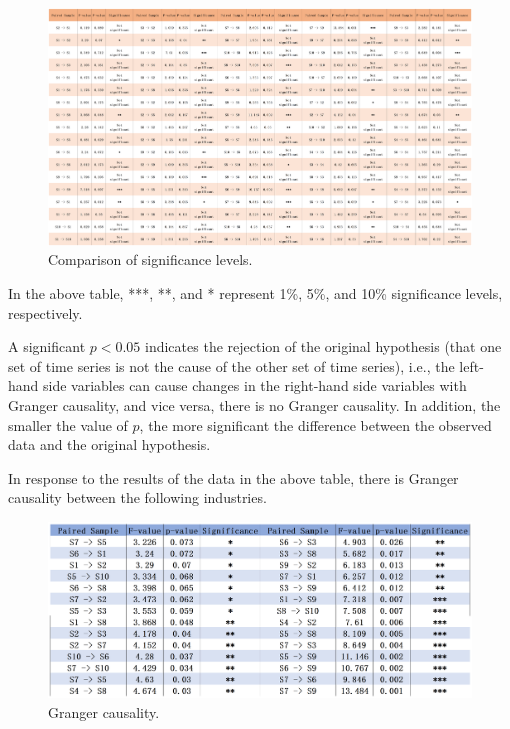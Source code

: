 \documentclass[12pt]{article}  %
\begin{document}
\begin{figure}[H]
	\centering
	\includegraphics[width=1\textwidth]{img/q1_spsspro}
	\caption{Comparison of significance levels.}
	\label{figure1}
\end{figure}

	In the above table, ***, **, and * represent 1\%, 5\%, and 10\% significance levels, respectively.

	A significant $p < 0.05$ indicates the rejection of the original hypothesis (that one set of time series is not the cause of the other set of time series), i.e., the left-hand side variables can cause changes in the right-hand side variables with Granger causality, and vice versa, there is no Granger causality. In addition, the smaller the value of $p$, the more significant the difference between the observed data and the original hypothesis.
	
	In response to the results of the data in the above table, there is Granger causality between the following industries.
	
	\begin{figure}[H]
		\centering
		\includegraphics[width=1\textwidth]{img/q1_spsspro2}
		\caption{Granger causality.}
		\label{figure2}
	\end{figure}
\end{document}
